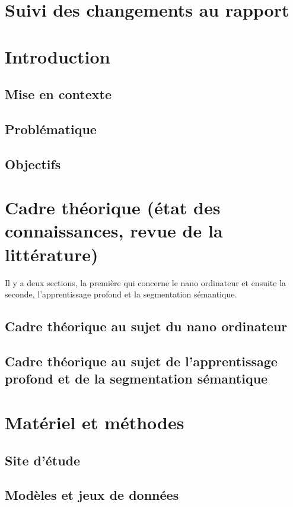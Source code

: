 \documentclass[12pt, letterpaper]{article}
\begin{document}
\section{Suivi des changements au rapport}

\section{Introduction}
\subsection{Mise en contexte}

\subsection{Problématique}

\subsection{Objectifs}

\section{Cadre théorique (état des connaissances, revue de la littérature)}
Il y a deux sections, la première qui concerne le nano ordinateur et ensuite la seconde, l'apprentissage profond et la segmentation sémantique.
\subsection{Cadre théorique au sujet du nano ordinateur}

\subsection{Cadre théorique au sujet de l'apprentissage profond et de la segmentation sémantique}

\section{Matériel et méthodes}
\subsection{Site d'étude}

\subsection{Modèles et jeux de données}

\end{document}
